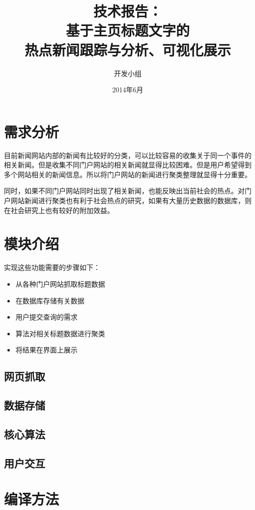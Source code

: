 \documentclass[12pt]{article}
\begin{document}
\title{技术报告：\\[3ex] 基于主页标题文字的\\热点新闻跟踪与分析、可视化展示\\[3ex]}

\author{开发小组}

\date{2014年6月}
\maketitle
\newpage
\renewcommand{\contentsname}{技术报告}
\tableofcontents
\newpage
\section{需求分析}
目前新闻网站内部的新闻有比较好的分类，可以比较容易的收集关于同一个事件的相关新闻。但是收集不同门户网站的相关新闻就显得比较困难。但是用户希望得到多个网站相关的新闻信息。所以将门户网站的新闻进行聚类整理就显得十分重要。

同时，如果不同门户网站同时出现了相关新闻，也能反映出当前社会的热点。对门户网站新闻进行聚类也有利于社会热点的研究，如果有大量历史数据的数据库，则在社会研究上也有较好的附加效益。

\section{模块介绍}
实现这些功能需要的步骤如下：
\begin{itemize}
\item 从各种门户网站抓取标题数据
\item 在数据库存储有关数据
\item 用户提交查询的需求
\item 算法对相关标题数据进行聚类
\item 将结果在界面上展示
\end{itemize}

\subsection{网页抓取}


\subsection{数据存储}


\subsection{核心算法}


\subsection{用户交互}


\section{编译方法}

\end{document}
